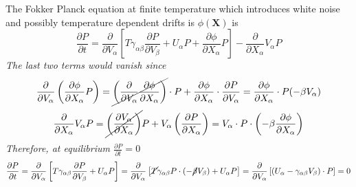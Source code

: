 \documentclass[books,12pt]{elegantpaper}
\newcommand{\pder}[2][]{\frac{\partial#1}{\partial#2}}
\newcommand{\beq}{\begin{equation}}
\newcommand{\eeq}{\end{equation}}
\newcommand{\tlag}[1]{\tag{#1} \label{#1}}
\newcommand{\tit}{\textit}
\begin{document}
The Fokker Planck equation at finite temperature which introduces white noise and possibly temperature dependent drifts is $\phi(\mathbf{X})$ is 
\beq \pder[P]{t} = \pder{V_\alpha} \left[ T \gamma_{\alpha\beta} \pder[P]{V_\beta} + U_\alpha P + \pder[\phi]{X_\alpha} P \right] - \pder{X_\alpha} V_\alpha P  \tlag{David.4} \eeq
\tit{The last two terms would vanish since}
$$ \pder{V_\alpha} \left( \pder[\phi]{X_\alpha} P \right) = \cancel{ \left( \pder{V_\alpha} \pder[\phi]{X_\alpha} \right) } \cdot P + \pder[\phi]{X_\alpha} \cdot \pder[P]{V_\alpha} = \pder[\phi]{X_\alpha} \cdot P (-\beta V_\alpha) $$
$$ \pder{X_\alpha} V_\alpha P = \cancel{ \left( \pder[V_\alpha]{X_\alpha} \right) } P + V_\alpha \left( \pder[P]{X_\alpha} \right) = V_\alpha \cdot P \cdot \left( -\beta \pder[\phi]{X_\alpha} \right) $$
\tit{Therefore, at equilibrium $\pder[P]{t} = 0$}
$$ \pder[P]{t} = \pder{V_\alpha} \left[ T \gamma_{\alpha\beta} \pder[P]{V_\beta} + U_\alpha P \right] = \pder{V_\alpha} \left[ \cancel{T} \gamma_{\alpha\beta} P \cdot (- \cancel\beta V_\beta) + U_\alpha P \right] = \pder{V_\alpha} \left[ (U_\alpha - \gamma_{\alpha\beta} V_\beta) \cdot P \right] = 0 $$
\end{document}
